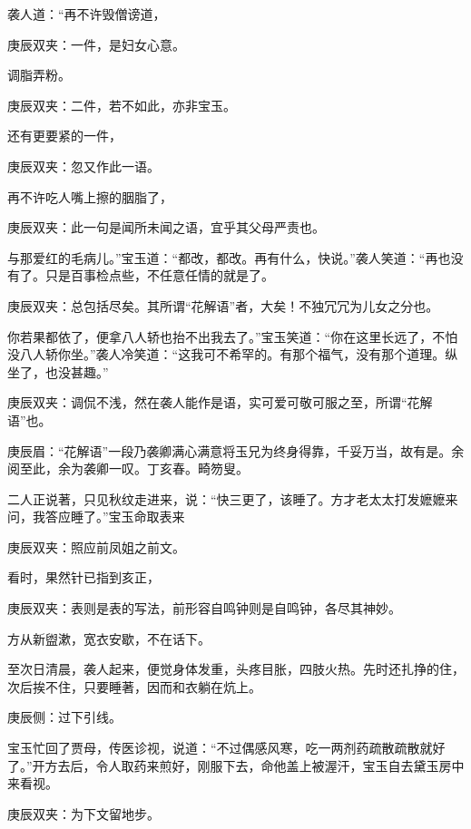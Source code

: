 \begin{parag}
    袭人道：“再不许毁僧谤道，\begin{note}庚辰双夹：一件，是妇女心意。\end{note}调脂弄粉。\begin{note}庚辰双夹：二件，若不如此，亦非宝玉。\end{note}还有更要紧的一件，\begin{note}庚辰双夹：忽又作此一语。\end{note}再不许吃人嘴上擦的胭脂了，\begin{note}庚辰双夹：此一句是闻所未闻之语，宜乎其父母严责也。\end{note}与那爱红的毛病儿。”宝玉道：“都改，都改。再有什么，快说。”袭人笑道：“再也没有了。只是百事检点些，不任意任情的就是了。\begin{note}庚辰双夹：总包括尽矣。其所谓“花解语”者，大矣！不独冗冗为儿女之分也。\end{note}你若果都依了，便拿八人轿也抬不出我去了。”宝玉笑道：“你在这里长远了，不怕没八人轿你坐。”袭人冷笑道：“这我可不希罕的。有那个福气，没有那个道理。纵坐了，也没甚趣。”\begin{note}庚辰双夹：调侃不浅，然在袭人能作是语，实可爱可敬可服之至，所谓“花解语”也。\end{note}\begin{note}庚辰眉：“花解语”一段乃袭卿满心满意将玉兄为终身得靠，千妥万当，故有是。余阅至此，余为袭卿一叹。丁亥春。畸笏叟。\end{note}
\end{parag}


\begin{parag}
    二人正说著，只见秋纹走进来，说：“快三更了，该睡了。方才老太太打发嬷嬷来问，我答应睡了。”宝玉命取表来\begin{note}庚辰双夹：照应前凤姐之前文。\end{note}看时，果然针已指到亥正，\begin{note}庚辰双夹：表则是表的写法，前形容自鸣钟则是自鸣钟，各尽其神妙。\end{note}方从新盥漱，宽衣安歇，不在话下。
\end{parag}


\begin{parag}
    至次日清晨，袭人起来，便觉身体发重，头疼目胀，四肢火热。先时还扎挣的住，次后挨不住，只要睡著，因而和衣躺在炕上。\begin{note}庚辰侧：过下引线。\end{note}宝玉忙回了贾母，传医诊视，说道：“不过偶感风寒，吃一两剂药疏散疏散就好了。”开方去后，令人取药来煎好，刚服下去，命他盖上被渥汗，宝玉自去黛玉房中来看视。\begin{note}庚辰双夹：为下文留地步。\end{note}
\end{parag}


